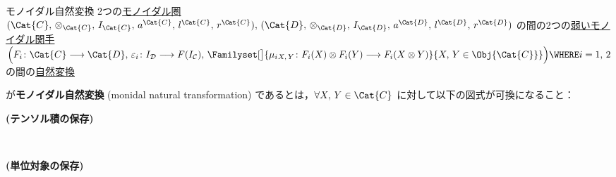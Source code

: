 \documentclass[TQFT_main]{subfiles}
\begin{document}
    
    \begin{mydef}[label=def:monoidal-nat]{モノイダル自然変換}
        2つの\hyperref[redef:monoidal-category]{モノイダル圏} $(\Cat{C},\, \otimes_{\Cat{C}},\, I_{\Cat{C}},\, a^{\Cat{C}},\, l^{\Cat{C}},\, r^{\Cat{C}}),\, (\Cat{D},\, \otimes_{\Cat{D}},\, I_{\Cat{D}},\, a^{\Cat{D}},\, l^{\Cat{D}},\, r^{\Cat{D}})$ の間の2つの\hyperref[redef:monidal-functor]{弱いモノイダル関手}
        $\Bigl(F_i\colon \Cat{C} \lto \Cat{D},\, \varepsilon_i \colon I_{\mathcal{D}} \lto F(I_{\mathcal{C}}),\, \Familyset[\big]{\mu_i{}_{X,\, Y} \colon F_i(X) \otimes F_i(Y) \lto F_i(X \otimes Y)}{X,\, Y \in \Obj{\Cat{C}}}\Bigr)\WHERE i = 1,\, 2$
        の間の\hyperref[def:nat]{自然変換}
        \begin{center}
        \end{center}
        が\textbf{モノイダル自然変換} (monidal natural transformation) であるとは，$\forall X,\, Y \in \Cat{C}$ に対して以下の図式が可換になること：
        \begin{description}
            \item[\textbf{(テンソル積の保存)}]　
            
            \begin{center}
            \end{center}
            
            \item[\textbf{(単位対象の保存)}]　
            
            \begin{center}
            \end{center}
            
        \end{description}
        
    \end{mydef}    
\end{document}

